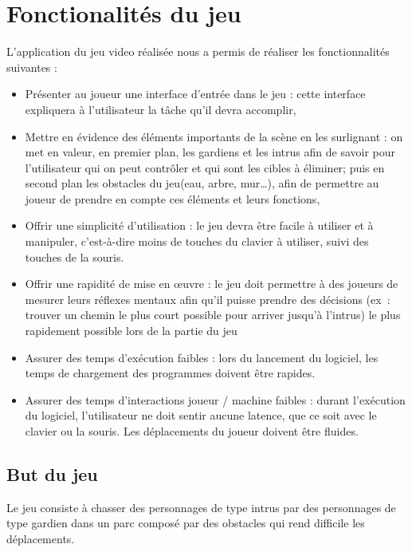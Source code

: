 \section{Fonctionalités du jeu}

 \paragraphe{}L'application du jeu video réalisée nous a permis de réaliser les fonctionnalités suivantes : 
 
\begin{itemize} 
 \item{}Présenter au joueur une interface d’entrée dans le jeu : 
 \paragraphe{}cette interface expliquera à l’utilisateur la tâche qu’il devra accomplir,
 
 \vspace{10mm}
\item{}Mettre en évidence des éléments importants de la scène en les surlignant : 
\paragraphe{}on met en valeur, en premier plan, les gardiens et les intrus afin de savoir pour l'utilisateur qui on peut contrôler et qui sont les cibles à éliminer; puis en second plan les obstacles du jeu(eau, arbre, mur…), afin de permettre au joueur de prendre en compte ces éléments et leurs fonctions,

\vspace{10mm}\item{}Offrir une simplicité d'utilisation : 
\paragraphe{}le jeu devra être facile à utiliser et à manipuler, c'est-à-dire moins de touches du clavier à utiliser, suivi des touches de la souris.

\vspace{10mm}
\item{}Offrir une rapidité de mise en œuvre : 
\paragraphe{}le jeu doit permettre à des joueurs de mesurer leurs réflexes mentaux afin qu’il puisse prendre des décisions (ex : trouver un chemin le plus court possible pour arriver jusqu'à l'intrus) le plus rapidement possible lors de la partie du jeu

\vspace{10mm}
\item{}Assurer des temps d'exécution faibles : 
\paragraphe{}lors du lancement du logiciel, les temps de chargement des programmes doivent être rapides.

\vspace{10mm}
\item{}Assurer des temps d'interactions joueur / machine faibles : 
\paragraphe{}durant l’exécution du logiciel, l’utilisateur ne doit sentir aucune latence, que ce soit avec le clavier ou la souris. Les déplacements du joueur doivent être fluides. 

\vspace{10mm}
\end{itemize}
\subsection{But du jeu} 
\paragraphe{}Le jeu consiste à chasser des personnages de type intrus par des personnages de type gardien dans un parc composé par des obstacles
qui rend difficile les déplacements.



